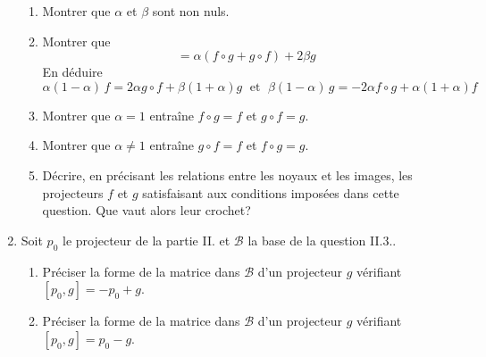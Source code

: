 \begin{enumerate}
\begin{enumerate}
\item Montrer que $\alpha$ et $\beta$ sont non  nuls.
\item Montrer que 
\begin{displaymath}
  [f,g] = \alpha \left( f\circ g + g\circ f\right)  + 2\beta g
\end{displaymath}
En déduire 
\begin{displaymath}
\alpha(1-\alpha)\,f = 2\alpha g \circ f + \beta(1+\alpha)g \;\text{ et }\;
\beta(1-\alpha)\,g = -2\alpha f \circ g + \alpha(1+\alpha)f
\end{displaymath}
\item Montrer que $\alpha = 1$ entraîne $f\circ g = f$ et $g\circ f = g$. 
\item Montrer que $\alpha \neq 1$ entraîne $g\circ f = f$ et $f\circ g = g$.
\item Décrire, en précisant les relations entre les noyaux et les images, les projecteurs $f$ et $g$ satisfaisant aux conditions imposées dans cette question. Que vaut alors leur crochet?
\end{enumerate}
\item Soit $p_{0}$ le projecteur de la partie II. et $\mathcal{B}$ la base de la question II.3.. 
\begin{enumerate}
  \item Préciser la forme de la matrice dans $\mathcal{B}$ d'un projecteur $g$ vérifiant $[p_0,g] = -p_{0} + g$.
  \item Préciser la forme de la matrice dans $\mathcal{B}$ d'un projecteur $g$ vérifiant $[p_0,g] = p_{0} - g$.
\end{enumerate}

\end{enumerate}

